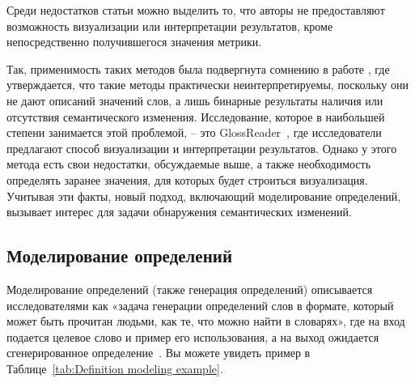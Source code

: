 \documentclass[LI,VKR]{HSEUniversity}
\begin{document}
%

Среди недостатков статьи можно выделить то, что авторы не предоставляют возможность визуализации
или интерпретации результатов, кроме непосредственно получившегося значения метрики.

Так, применимость таких методов была подвергнута сомнению в работе
\cite{DefinitionGenerationMainArticle},
где
утверждается, что такие методы практически неинтерпретируемы,
поскольку они не дают описаний значений слов,
а лишь бинарные результаты наличия или отсутствия семантического изменения.
Исследование, которое в наибольшей степени занимается этой проблемой, – это GlossReader~\cite{GlossReader},
где исследователи предлагают способ визуализации и интерпретации результатов.
Однако у этого метода есть свои недостатки, обсуждаемые выше, а также
необходимость определять заранее значения, для которых будет строиться визуализация.
Учитывая эти факты, новый подход, включающий моделирование определений,
вызывает интерес для задачи обнаружения семантических изменений.

\subsection{Моделирование определений}

Моделирование определений (также генерация определений) описывается исследователями как
«задача генерации определений слов в формате,
который может быть прочитан людьми, как те, что можно найти в словарях»,
где на вход подается целевое слово и пример его использования, а на выход
ожидается сгенерированное определение~\cite{DefinitionGenerationMainArticle}.
Вы можете увидеть пример в Таблице~\ref{tab:Definition modeling example}.
\end{document}
